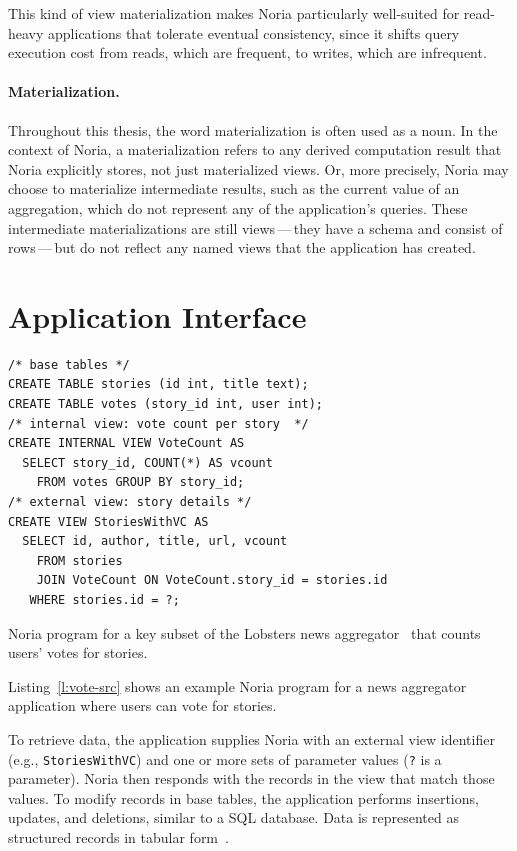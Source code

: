 This kind of view materialization makes Noria particularly well-suited for
read-heavy applications that tolerate eventual consistency, since it shifts
query execution cost from reads, which are frequent, to writes, which are
infrequent.

\paragraph{Materialization.}
Throughout this thesis, the word materialization is often used as a noun. In the
context of Noria, a materialization refers to any derived computation result
that Noria explicitly stores, not just materialized views. Or, more precisely,
Noria may choose to materialize intermediate results, such as the current value
of an aggregation, which do not represent any of the application's queries.
These intermediate materializations are still views\,---\,they have a schema and
consist of rows\,---\,but do not reflect any named views that the application
has created.

\section{Application Interface}

\begin{listing}[h]
  \begin{verbatim}
/* base tables */
CREATE TABLE stories (id int, title text);
CREATE TABLE votes (story_id int, user int);
/* internal view: vote count per story  */
CREATE INTERNAL VIEW VoteCount AS
  SELECT story_id, COUNT(*) AS vcount
    FROM votes GROUP BY story_id;
/* external view: story details */
CREATE VIEW StoriesWithVC AS
  SELECT id, author, title, url, vcount
    FROM stories
    JOIN VoteCount ON VoteCount.story_id = stories.id
   WHERE stories.id = ?;
  \end{verbatim}
  \caption{Noria program for a key subset of the Lobsters news
           aggregator~\cite{lobsters} that counts users' votes for stories.}
  \label{l:vote-src}
\end{listing}

Listing~\vref{l:vote-src} shows an example Noria program for a news aggregator
application where users can vote for stories.

To retrieve data, the application supplies Noria with an external view
identifier (e.g., \texttt{StoriesWithVC}) and one or more sets of parameter
values (\texttt{?} is a parameter). Noria then responds with the records in the
view that match those values. To modify records in base tables, the application
performs insertions, updates, and deletions, similar to a SQL database. Data is
represented as structured records in tabular form~\cite{spanner, bigtable}.

